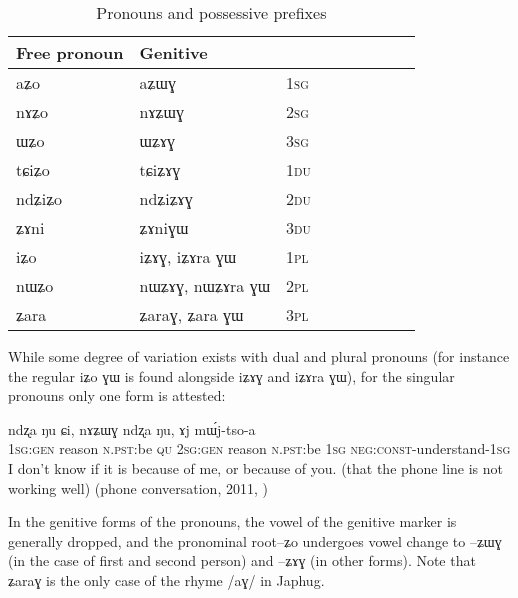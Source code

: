 \documentclass[oldfontcommands,oneside,a4paper,11pt]{memoir}
\newcommand{\ipa}[1]{{\phon #1}} %
\newcommand{\wav}[1]{}%
\newcommand{\const}{\textsc{const}}
\newcommand{\du}{\textsc{du}}
\newcommand{\gen}{\textsc{gen}}
\newcommand{\negat}{\textsc{neg}}
\newcommand{\npst}{\textsc{n.pst}}
\newcommand{\pl}{\textsc{pl}}
\newcommand{\sg}{\textsc{sg}}
\begin{document}


\begin{table}[H] \centering
\caption{Pronouns and possessive prefixes }\label{tab:pronoun}
\begin{tabular}{lllllllll} \toprule
 Free pronoun & Genitive & \\
\midrule
 \ipa{aʑo}  &	\ipa{aʑɯɣ}  &		1\sg{} \\ 
\ipa{nɤʑo}  &	\ipa{nɤʑɯɣ}  &			2\sg{} \\ 
\ipa{ɯʑo}  &	\ipa{ɯʑɤɣ}  &			3\sg{} \\ 
\ipa{tɕiʑo}  &	\ipa{tɕiʑɤɣ}  &			1\du{} \\ 
\ipa{ndʑiʑo}  &	\ipa{ndʑiʑɤɣ}  &		2\du{} \\	 
\ipa{ʑɤni}  &	\ipa{ʑɤniɣɯ}  &		3\du{} \\	 
\ipa{iʑo}  &	\ipa{iʑɤɣ}, 	\ipa{iʑɤra ɣɯ}   &			1\pl{} \\ 
\ipa{nɯʑo}  &	\ipa{nɯʑɤɣ}, 	\ipa{nɯʑɤra ɣɯ}  &			2\pl{} \\ 
\ipa{ʑara}  &	\ipa{ʑaraɣ},   \ipa{ʑara ɣɯ}&			3\pl{}  \\  
\bottomrule
\end{tabular}
\end{table}

While some degree of variation exists with dual and plural pronouns (for instance the regular \ipa{iʑo ɣɯ} is found alongside \ipa{iʑɤɣ} and \ipa{iʑɤra ɣɯ}), for the singular pronouns only one form is attested:

\begin{exe}
\ex
\gll \ipa{aʑɯɣ} 	\ipa{ndʐa} 	\ipa{ŋu} 	\ipa{ɕi,} 	\ipa{nɤʑɯɣ} 	\ipa{ndʐa} 	\ipa{ŋu,} 	\ipa{ɤj} 	\ipa{mɯ́j-tso-a}   \\
1\sg{}:\gen{} reason \npst{}:be \textsc{qu} 2\sg{}:\gen{} reason \npst{}:be 1\sg{} \negat{}:\const{}-understand-1\sg{}\\
\glt  I don't know if it is because of me, or because of you. (that the phone line is not working well) (phone conversation, 2011, \wav{8_ndzxa})
\end{exe} 

In the genitive forms of the pronouns, the vowel of the genitive marker is generally dropped, and the pronominal root--\ipa{ʑo} undergoes vowel change to --\ipa{ʑɯɣ} (in the case of first and second person) and --\ipa{ʑɤɣ} (in other forms). Note that \ipa{ʑaraɣ} is the only case of the rhyme /aɣ/ in Japhug.
\end{document}
